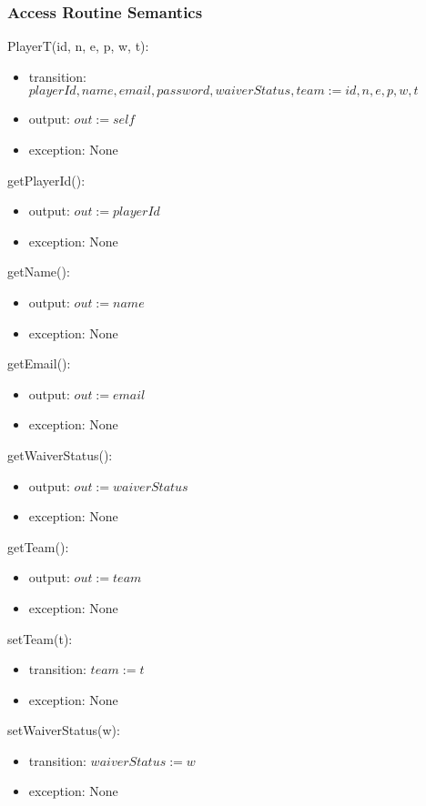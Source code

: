 \documentclass[12pt, titlepage]{article}
\begin{document}
\subsubsection{Access Routine Semantics}

\noindent PlayerT(id, n, e, p, w, t):
\begin{itemize}
\item transition: $playerId, name, email, password, waiverStatus, team := id, n, e, p, w, t$
\item output: $out := self$
\item exception: None
\end{itemize}

\noindent getPlayerId():
\begin{itemize}
\item output: $out := playerId$
\item exception: None
\end{itemize}

\noindent getName():
\begin{itemize}
\item output: $out := name$
\item exception: None
\end{itemize}

\noindent getEmail():
\begin{itemize}
\item output: $out := email$
\item exception: None
\end{itemize}

\noindent getWaiverStatus():
\begin{itemize}
\item output: $out := waiverStatus$
\item exception: None
\end{itemize}

\noindent getTeam():
\begin{itemize}
\item output: $out := team$
\item exception: None
\end{itemize}

\noindent setTeam(t):
\begin{itemize}
\item transition: $team := t$
\item exception: None
\end{itemize}

\noindent setWaiverStatus(w):
\begin{itemize}
\item transition: $waiverStatus := w$
\item exception: None
\end{itemize}
\end{document}
